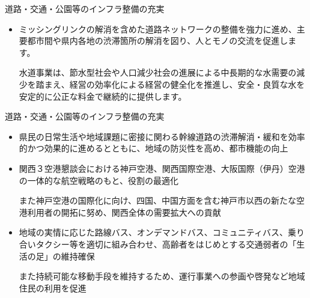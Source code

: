\documentclass[dvipdfmx]{beamer}
\begin{document}
    \begin{frame}{道路・交通・公園等のインフラ整備の充実}{}
        \begin{small}
            \begin{itemize}
                \setlength{\parsep}{.5mm}
                \setlength{\itemsep}{2mm}
                \item ミッシングリンクの解消を含めた道路ネットワークの整備を強力に進め、主要都市間や県内各地の渋滞箇所の解消を図り、人とモノの交流を促進します。\par
                水道事業は、節水型社会や人口減少社会の進展による中長期的な水需要の減少を踏まえ、経営の効率化による経営の健全化を推進し、安全・良質な水を安定的に公正な料金で継続的に提供します。
            \end{itemize}
        \end{small}
    \end{frame}

    \begin{frame}{道路・交通・公園等のインフラ整備の充実}{}
        \begin{small}
            \begin{itemize}
                \setlength{\parsep}{.5mm}
                \setlength{\itemsep}{2mm}
                \item 県民の日常生活や地域課題に密接に関わる幹線道路の渋滞解消・緩和を効率的かつ効果的に進めるとともに、地域の防災性を高め、都市機能の向上
                \item 関西３空港懇談会における神戸空港、関西国際空港、大阪国際（伊丹）空港の一体的な航空戦略のもと、役割の最適化\par
                また神戸空港の国際化に向け、四国、中国方面を含む神戸市以西の新たな空港利用者の開拓に努め、関西全体の需要拡大への貢献
                \item 地域の実情に応じた路線バス、オンデマンドバス、コミュニティバス、乗り合いタクシー等を適切に組み合わせ、高齢者をはじめとする交通弱者の「生活の足」の維持確保\par
                また持続可能な移動手段を維持するため、運行事業への参画や啓発など地域住民の利用を促進
            \end{itemize}
        \end{small}
    \end{frame}
\end{document}
